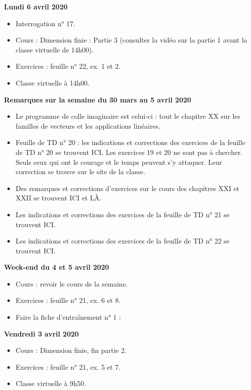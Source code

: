 \documentclass[12pt,a4paper]{article}
\begin{document}
\noindent\textbf{\bf Lundi 6 avril 2020}
\begin{itemize}
\item Interrogation n° 17.
\item Cours : Dimension finie : Partie 3 (consulter la vidéo sur la partie 1 avant la classe virtuelle de 14h00).
\item Exercices : feuille n° 22, ex. 1 et 2.
\item Classe virtuelle à 14h00.\vspace{.4cm}
\end{itemize}


\noindent\textbf{\bf Remarques sur la semaine du 30 mars au 5 avril 2020}
\begin{itemize}
\item Le programme de colle imaginaire est celui-ci : tout le chapitre XX sur les familles de vecteurs et les applications linéaires.
\item Feuille de TD n° 20 : les indications et corrections des exercices de la feuille de TD n° 20 se trouvent ICI. Les exercices 19 et 20 ne sont pas à chercher. Seuls ceux qui ont le courage et le temps peuvent s'y attaquer. Leur correction se trouve sur le site de la classe.
\item Des remarques et corrections d'exercices sur le cours des chapitres XXI et XXII se trouvent ICI et LÀ.
\item Les indications et corrections des exercices de la feuille de TD n° 21 se trouvent ICI.
\item Les indications et corrections des exercices de la feuille de TD n° 22 se trouvent ICI.\vspace{.4cm}
\end{itemize}

\noindent\textbf{Week-end du 4 et 5 avril 2020}
\begin{itemize}
\item Cours : revoir le cours de la semaine.
\item Exercices : feuille n° 21, ex. 6 et 8.
\item Faire la fiche d'entraînement n° 1 : 
\vspace{.4cm}
\end{itemize}

\noindent\textbf{\bf Vendredi 3 avril 2020}
\begin{itemize}
\item Cours : Dimension finie, fin partie 2.
\item Exercices : feuille n° 21, ex. 5 et 7.
\item Classe virtuelle à 9h50.\vspace{.4cm}
\end{itemize}
\end{document}
